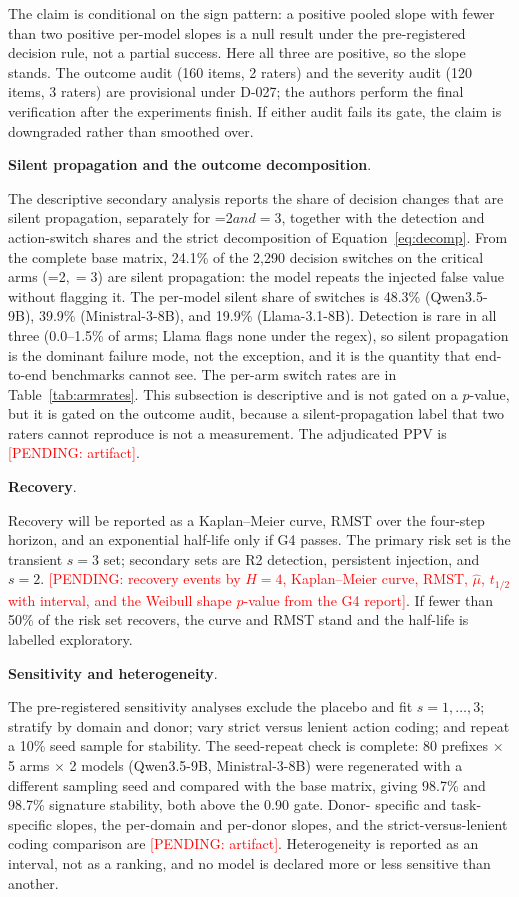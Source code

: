 \documentclass[a4paper,fleqn]{cas-sc}
\newcommand{\pending}[1]{\textcolor{red}{[PENDING: #1]}}
\begin{document}
The claim is conditional on the sign pattern: a positive pooled slope with fewer than two
positive per-model slopes is a null result under the pre-registered decision rule, not a partial
success. Here all three are positive, so the slope stands. The outcome audit (160 items, 2
raters) and the severity audit (120 items, 3 raters) are provisional under D-027; the authors
perform the final verification after the experiments finish. If either audit fails its gate,
the claim is downgraded rather than smoothed over.

\noindent\textbf{Silent propagation and the outcome decomposition}.\

The descriptive secondary analysis reports the share of decision changes that are silent
propagation, separately for =2$ and =3$, together with the detection and action-switch shares
and the strict decomposition of Equation~\ref{eq:decomp}. From the complete base matrix,
24.1\% of the 2{,}290 decision switches on the critical arms (=2$, =3$) are silent
propagation: the model repeats the injected false value without flagging it. The per-model
silent share of switches is 48.3\% (Qwen3.5-9B), 39.9\% (Ministral-3-8B), and 19.9\%
(Llama-3.1-8B). Detection is rare in all three (0.0--1.5\% of arms; Llama flags none under
the regex), so silent propagation is the dominant failure mode, not the exception, and it is
the quantity that end-to-end benchmarks cannot see. The per-arm switch rates are in
Table~\ref{tab:armrates}. This subsection is descriptive and is not gated on a $p$-value,
but it is gated on the outcome audit, because a silent-propagation label that two raters
cannot reproduce is not a measurement. The adjudicated PPV is \pending{artifact}.

\noindent\textbf{Recovery}.\

Recovery will be reported as a Kaplan--Meier curve, RMST over the four-step horizon, and an
exponential half-life only if G4 passes. The primary risk set is the transient $s=3$ set;
secondary sets are R2 detection, persistent injection, and $s=2$. \pending{recovery events by
$H=4$, Kaplan--Meier curve, RMST, $\hat{\mu}$, $t_{1/2}$ with interval, and the Weibull shape
$p$-value from the G4 report}. If fewer than 50\% of the risk set recovers, the curve and RMST
stand and the half-life is labelled exploratory.

\noindent\textbf{Sensitivity and heterogeneity}.\

The pre-registered sensitivity analyses exclude the placebo and fit $s=1,\dots,3$; stratify by
domain and donor; vary strict versus lenient action coding; and repeat a 10\% seed sample for
stability. The seed-repeat check is complete: 80 prefixes $\times$ 5 arms $\times$ 2 models
(Qwen3.5-9B, Ministral-3-8B) were regenerated with a different sampling seed and compared with
the base matrix, giving 98.7\% and 98.7\% signature stability, both above the 0.90 gate. Donor-
specific and task-specific slopes, the per-domain and per-donor slopes, and the
strict-versus-lenient coding comparison are \pending{artifact}. Heterogeneity is reported as an
interval, not as a ranking, and no model is declared more or less sensitive than another.
\end{document}
